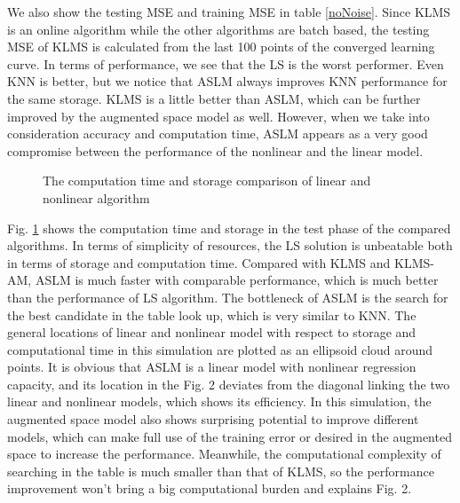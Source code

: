 \documentclass{article}
\begin{document}
We also show the testing MSE and training MSE in table \ref{noNoise}. Since KLMS is an online algorithm while the other algorithms are batch based, the testing MSE of KLMS is calculated from the last 100 points of the converged learning curve. In terms of performance, we see that the LS is the worst performer. Even KNN is better, but we notice that ASLM always improves KNN performance for the same storage. KLMS is a little better than ASLM, which can be further improved by the augmented space model as well. However, when we take into consideration accuracy and computation time, ASLM appears as a very good compromise between the performance of the nonlinear and the linear model. 
\begin{figure}[htbp]
	\vspace{-9mm}
	\caption{The computation time and storage comparison of linear and nonlinear algorithm }\label{area}
	\vspace{-2mm}
\end{figure}
Fig. \ref{area} shows the computation time and storage in the test phase of the compared algorithms. In terms of simplicity of resources, the LS solution is unbeatable both in terms of storage and computation time. Compared with KLMS and KLMS-AM, ASLM is much faster with comparable performance, which is much better than the performance of LS algorithm. The bottleneck of ASLM is the search for the best candidate in the table look up, which is very similar to KNN. The general locations of linear and nonlinear model with respect to storage and computational time in this simulation are plotted as an ellipsoid cloud around points.
It is obvious that ASLM is a linear model with nonlinear regression capacity, and its location in the Fig. 2 deviates from the diagonal linking the two linear and nonlinear models, which shows its efficiency. In this simulation, the augmented space model also shows surprising potential to improve different models, which can make full use of the training error or desired in the augmented space to increase the performance. Meanwhile, the computational complexity of searching in the table is much smaller than that of KLMS, so the performance improvement won't bring a big computational burden and explains Fig. 2.
\vspace{-1mm}
\end{document}
